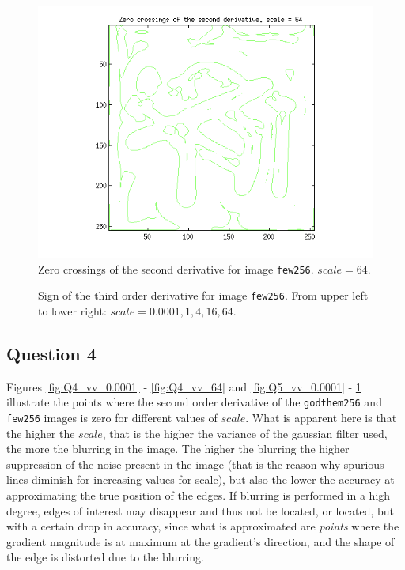 \begin{figure}[H]
	\centering
	\includegraphics[scale=0.8]{./images/Q5/vv/64.png}
	\caption{Zero crossings of the second derivative for image \texttt{few256}. $scale = 64$.}
	\label{fig:Q5_vv_64}
\end{figure}


\begin{figure}[H]
	\centering
	\scalebox{0.6}{}
	\caption{Sign of the third order derivative for image \texttt{few256}. From upper left to lower right: $scale = 0.0001, 1, 4, 16, 64$.}
	\label{fig:Q5_vvv_}
\end{figure}



\subsection{Question 4}

Figures \ref{fig:Q4_vv_0.0001} - \ref{fig:Q4_vv_64} and
\ref{fig:Q5_vv_0.0001} - \ref{fig:Q5_vv_64} illustrate the points where
the second order derivative of the \texttt{godthem256} and \texttt{few256} images
is zero for different values of $scale$. What is apparent here is that the higher the $scale$,
that is the higher the variance of the gaussian filter used, the more the blurring
in the image. The higher the blurring the higher suppression of the noise
present in the image (that is the reason why spurious lines diminish for
increasing values for scale), but also the lower the accuracy at approximating
the true position of the edges. If blurring is performed in a high degree,
edges of interest may disappear and thus not be located,
or located, but with a certain drop in accuracy, since what is approximated are
\textit{points} where the gradient magnitude is at maximum at the gradient's direction,
and the shape of the edge is distorted due to the blurring.


